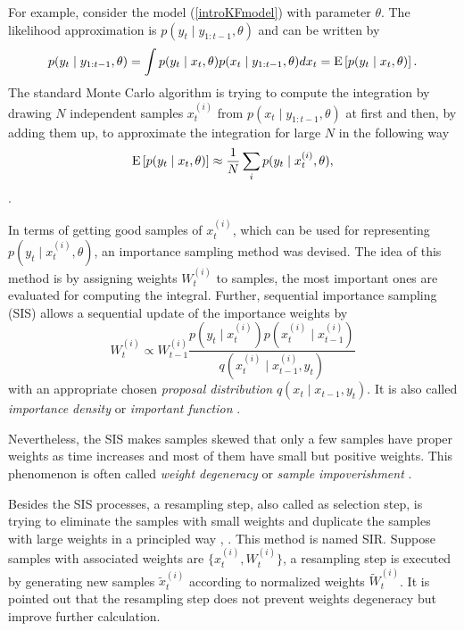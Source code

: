 For example, consider the model (\ref{introKFmodel}) with parameter $\theta$. The likelihood approximation is $p(y_t\mid y_{1:t-1},\theta)$ and can be written by
\begin{equation*}
p(y_t\mid y_{1:t-1},\theta) = \int p(y_t\mid x_t,\theta)p(x_t\mid y_{1:t-1},\theta) dx_t = \mathrm{E} \left[p(y_t\mid x_t,\theta)\right].
\end{equation*}
The standard Monte Carlo algorithm is trying to compute the integration by drawing $N$ independent samples $x_t^{(i)}$ from $p(x_t\mid y_{1:t-1},\theta)$ at first and then, by adding them up, to approximate the integration for large $N$ in the following way 
\begin{equation*}
\mathrm{E}\left[p(y_t\mid x_t,\theta)\right]\approx \frac{1}{N}\sum_i p(y_t\mid x_t^{(i)},\theta), 
\end{equation*}
\cite{kalos2008monte}.

In terms of getting good samples of $x_t^{(i)}$, which can be used for representing $p(y_t\mid x_t^{(i)},\theta)$, an importance sampling method was devised. The idea of this method is by assigning weights $W_t^{(i)}$ to samples, the most important ones are evaluated for computing the integral. Further, sequential importance sampling (SIS) allows a sequential update of the importance weights by 
\begin{equation*}
W_t^{(i)} \propto W_{t-1}^{(i)} \frac{ p(y_t \mid x_t^{(i)}) p(x_{t}^{(i)}\mid x_{t-1}^{(i)}) }{q(x_{t}^{(i)}\mid x_{t-1}^{(i)},y_{t})}
\end{equation*}
with an appropriate chosen \textit{proposal distribution} $q(x_{t}\mid  x_{t-1},y_{t})$. It is also called \textit{importance density} or \textit{important function} \cite{chen2003bayesian}. 


Nevertheless, the SIS makes samples skewed that only a few samples have proper weights as time increases and most of them have small but positive weights. This phenomenon is often called \textit{weight degeneracy} or \textit{sample impoverishment} \cite{green1995reversible} \cite{berzuini1997dynamic}. 


Besides the SIS processes, a resampling step, also called as selection step, is trying to eliminate the samples with small weights and duplicate the samples with large weights in a principled way \cite{rubin2004multiple}, \cite{tanner1987calculation}. This method is named SIR. Suppose samples with associated weights are $\{x_t^{(i)},W_t^{(i)}\}$, a resampling step is executed by generating new samples $\tilde{x}_t^{(i)}$ according to normalized weights $\tilde{W}_t^{(i)}$. It is pointed out that the resampling step does not prevent weights degeneracy but improve further calculation. 

